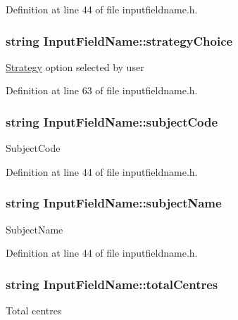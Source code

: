Definition at line 44 of file inputfieldname.\-h.

\hypertarget{classInputFieldName_a9a6b827d404cb279cc0ed836c069e4a9}{
\subsubsection[{strategy\-Choice}]{\setlength{\rightskip}{0pt plus 5cm}string Input\-Field\-Name\-::strategy\-Choice}}\label{classInputFieldName_a9a6b827d404cb279cc0ed836c069e4a9}
\hyperlink{classStrategy}{Strategy} option selected by user 

Definition at line 63 of file inputfieldname.\-h.

\hypertarget{classInputFieldName_af1cc6871c33344c365e6e25ea482bd48}{
\subsubsection[{subject\-Code}]{\setlength{\rightskip}{0pt plus 5cm}string Input\-Field\-Name\-::subject\-Code}}\label{classInputFieldName_af1cc6871c33344c365e6e25ea482bd48}
Subject\-Code 

Definition at line 44 of file inputfieldname.\-h.

\hypertarget{classInputFieldName_a0614731b959afef6bb00f9fc957e7521}{
\subsubsection[{subject\-Name}]{\setlength{\rightskip}{0pt plus 5cm}string Input\-Field\-Name\-::subject\-Name}}\label{classInputFieldName_a0614731b959afef6bb00f9fc957e7521}
Subject\-Name 

Definition at line 44 of file inputfieldname.\-h.

\hypertarget{classInputFieldName_af88ac102ec3a4adbb9edc7c3d61919cb}{
\subsubsection[{total\-Centres}]{\setlength{\rightskip}{0pt plus 5cm}string Input\-Field\-Name\-::total\-Centres}}\label{classInputFieldName_af88ac102ec3a4adbb9edc7c3d61919cb}
Total centres 

